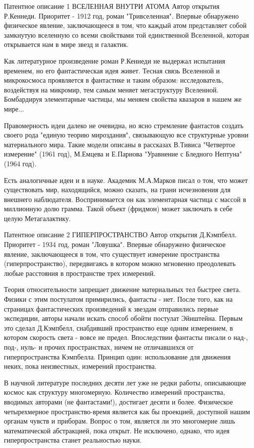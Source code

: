 \documentclass[11pt,a4paper]{article}
\begin{document}
Патентное описание 1
ВСЕЛЕННАЯ ВНУТРИ АТОМА
Автор открытия Р.Кеннеди. Приоритет - 1912 год, роман "Тривселенная".
Впервые обнаружено физическое явление, заключающееся в том, что каждый атом представляет собой замкнутую вселенную со всеми свойствами той единственной Вселенной, которая открывается нам в мире звезд и галактик.

Как литературное произведение роман Р.Кеннеди не выдержал испытания временем, но его фантастическая идея живет. Тесная связь Вселенной и микрокосмоса проявляется в фантастике и таким образом: исследователь, воздействуя на микромир, тем самым меняет мегаструктуру Вселенной. Бомбардируя элементарные частицы, мы меняем свойства квазаров в нашем же мире...

Правомерность идеи далеко не очевидна, но ясно стремление фантастов создать своего рода "единую теорию мироздания", связывающую все структурные уровни материального мира. Такие модели описаны в рассказах В.Тивиса "Четвертое измерение" (1961 год), М.Емцева и Е.Парнова "Уравнение с Бледного Нептуна" (1964 год).

Есть аналогичные идеи и в науке. Академик М.А.Марков писал о том, что может существовать мир, находящийся, можно сказать, на грани исчезновения для внешнего наблюдателя. Воспринимается он как элементарная частица с массой в миллионную долю грамма. Такой объект (фридмон) может заключать в себе целую Метагалактику.

Патентное описание 2
ГИПЕРПРОСТРАНСТВО
Автор открытия Д.Кэмпбелл. Приоритет - 1934 год, роман "Ловушка".
Впервые обнаружено физическое явление, заключающееся в том, что существует измерение пространства (гиперпространство), передвигаясь в котором можно мгновенно преодолевать любые расстояния в пространстве трех измерений.

Теория относительности запрещает движение материальных тел быстрее света. Физики с этим постулатом примирились, фантасты - нет. После того, как на страницах фантастических произведений к звездам отправились первые экспедиции, авторы начали искать способ обойти постулат Эйнштейна. Первым это сделал Д.Кэмпбелл, снабдивший пространство еще одним измерением, в котором скорость света - вовсе не предел. Впоследствии фантасты писали о над-, под-, нуль- и прочих пространствах, ничем не отличавшихся от гиперпространства Кэмпбелла. Принцип один: использование для движения неких, пока неизвестных, измерений пространства.

В научной литературе последних десяти лет уже не редки работы, описывающие космос как структуру многомерную. Количество измерений пространства, вводимых авторами (не фантастами!), достигает десяти и более. Физическое четырехмерное пространство-время является как бы проекцией, доступной нашим органам чувств и приборам. Вопрос о том, является ли это многомерие лишь математической абстракцией, пока открыт. Не исключено, однако, что идея гиперпространства станет реальностью науки.
\end{document}
